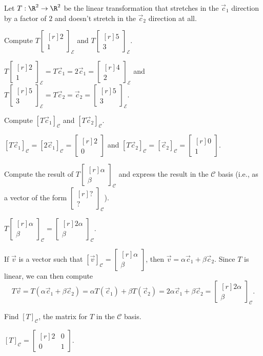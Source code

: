 \documentclass{problemset}
\newcommand{\mat}[1]{\begin{bmatrix*}[r]#1\end{bmatrix*}}
\begin{document}
	Let $T:\R^2\to\R^2$ be the linear transformation that stretches in the $\vec c_1$ direction by a factor of $2$
	and doesn't stretch in the $\vec c_2$ direction at all.
	\begin{parts}[resume]
		\item Compute $T\mat{2\\1}_{\mathcal E}$ and $T\mat{5\\3}_{\mathcal E}$.
			\begin{solution}[inline]
				$T\mat{2\\1}_{\mathcal E}=T\vec c_1=2\vec c_1=\mat{4\\2}_{\mathcal E}$ and
				$T\mat{5\\3}_{\mathcal E}=T\vec c_2=\vec c_2=\mat{5\\3}_{\mathcal E}$.
			\end{solution}
		\item Compute $[T\vec c_1]_{\mathcal C}$ and $[T\vec c_2]_{\mathcal C}$.
			\begin{solution}[inline]
				$[T\vec c_1]_{\mathcal C}=[2\vec c_1]_{\mathcal C}=\mat{2\\0}$ and
				$[T\vec c_2]_{\mathcal C}=[\vec c_2]_{\mathcal C}=\mat{0\\1}$.
			\end{solution}
		\item Compute the result of $T\mat{\alpha\\\beta}_{\mathcal C}$ and express the result in the
			$\mathcal C$ basis (i.e., as a vector of the form $\mat{?\\?}_{\mathcal C}$).
			\begin{solution}
				$T\mat{\alpha\\\beta}_{\mathcal C}=\mat{2\alpha\\\beta}_{\mathcal C}$.

				If $\vec v$ is a vector such that
				$[\vec v]_{\mathcal C}=\mat{\alpha\\\beta}$, then
				$\vec v=\alpha\vec c_1+\beta\vec c_2$. Since $T$ is linear, we can
				then compute
				\[
					T\vec v
					=T(\alpha\vec c_1+\beta\vec c_2)
					=\alpha T(\vec c_1)+\beta T(\vec c_2)
					=2\alpha\vec c_1+\beta\vec c_2
					=\mat{2\alpha\\\beta}_{\mathcal C}.
				\]
			\end{solution}
		\item Find $[T]_{\mathcal C}$, the matrix for $T$ in the $\mathcal C$ basis.
			\begin{solution}
				$[T]_{\mathcal C}=\mat{2&0\\0&1}$.


\end{solution}
\end{parts}
\end{document}

